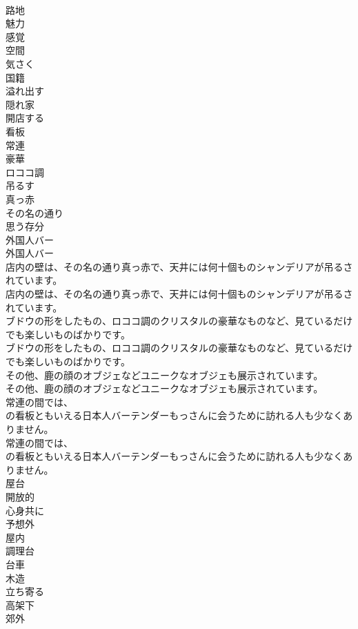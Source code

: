 \documentclass[8pt]{extreport}
\begin{document}
\begin{CJK}{UTF8}{min}
\\	路地
\\	魅力
\\	感覚
\\	空間
\\	気さく
\\	国籍
\\	溢れ出す
\\	隠れ家
\\	開店する
\\	看板
\\	常連
\\	豪華
\\	ロココ調
\\	吊るす
\\	真っ赤
\\	その名の通り
\\	思う存分
\\	外国人バー	
\\	外国人バー 
\\	店内の壁は、その名の通り真っ赤で、天井には何十個ものシャンデリアが吊るされています。	
\\	店内の壁は、その名の通り真っ赤で、天井には何十個ものシャンデリアが吊るされています。 
\\	ブドウの形をしたもの、ロココ調のクリスタルの豪華なものなど、見ているだけでも楽しいものばかりです。	
\\	ブドウの形をしたもの、ロココ調のクリスタルの豪華なものなど、見ているだけでも楽しいものばかりです。 
\\	その他、鹿の顔のオブジェなどユニークなオブジェも展示されています。	
\\	その他、鹿の顔のオブジェなどユニークなオブジェも展示されています。 
\\	常連の間では、
\\	の看板ともいえる日本人バーテンダーもっさんに会うために訪れる人も少なくありません。	
\\	常連の間では、
\\	の看板ともいえる日本人バーテンダーもっさんに会うために訪れる人も少なくありません。 
\\	屋台
\\	開放的
\\	心身共に
\\	予想外
\\	屋内
\\	調理台
\\	台車
\\	木造
\\	立ち寄る
\\	高架下
\\	郊外

\end{CJK}
\end{document}
